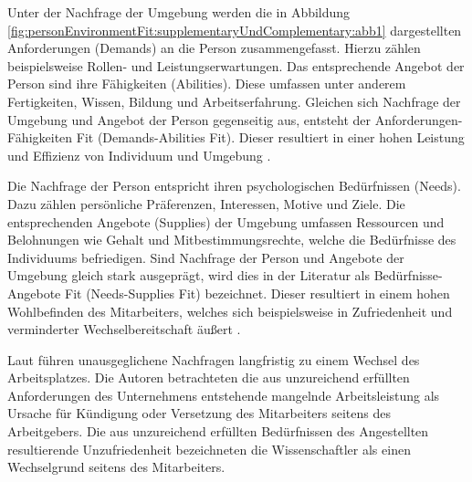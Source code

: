 Unter der Nachfrage der Umgebung werden die in Abbildung \ref{fig:personEnvironmentFit:supplementaryUndComplementary:abb1} dargestellten Anforderungen (Demands) an die Person zusammengefasst. Hierzu zählen beispielsweise Rollen- und Leistungserwartungen. Das entsprechende Angebot der Person sind ihre Fähigkeiten (Abilities). Diese umfassen unter anderem Fertigkeiten, Wissen, Bildung und Arbeitserfahrung. Gleichen sich Nachfrage der Umgebung und Angebot der Person gegenseitig aus, entsteht der Anforderungen-Fähigkeiten Fit (Demands-Abilities Fit). Dieser resultiert in einer hohen Leistung und Effizienz von Individuum und Umgebung \cite[S. 3f.]{edwards:1991}\cite[S. 5]{edwards:1996}\cite[S. 4f.]{edwards:2007}\cite[S. 6]{su:2015}.

Die Nachfrage der Person entspricht ihren psychologischen Bedürfnissen (Needs). Dazu zählen persönliche Präferenzen, Interessen, Motive und Ziele. Die entsprechenden Angebote (Supplies) der Umgebung umfassen Ressourcen und Belohnungen wie Gehalt und Mitbestimmungsrechte, welche die Bedürfnisse des Individuums befriedigen. Sind Nachfrage der Person und Angebote der Umgebung gleich stark ausgeprägt, wird dies in der Literatur als Bedürfnisse-Angebote Fit (Needs-Supplies Fit) bezeichnet. Dieser resultiert in einem hohen Wohlbefinden des Mitarbeiters, welches sich beispielsweise in Zufriedenheit und verminderter Wechselbereitschaft äußert \cite[S. 2]{edwards:2004}\cite[S. 2f.]{edwards:1996}\cite[S. 4]{edwards:2008}\cite[S. 4f.]{edwards:2007}\cite[S. 6]{su:2015}.

Laut \textcite[S. 9ff.]{workAdjustment:1964} führen unausgeglichene Nachfragen langfristig zu einem Wechsel des Arbeitsplatzes. Die Autoren betrachteten die aus unzureichend erfüllten Anforderungen des Unternehmens entstehende mangelnde Arbeitsleistung als Ursache für Kündigung oder Versetzung des Mitarbeiters seitens des Arbeitgebers. Die aus unzureichend erfüllten Bedürfnissen des Angestellten resultierende Unzufriedenheit bezeichneten die Wissenschaftler als einen Wechselgrund seitens des Mitarbeiters.

